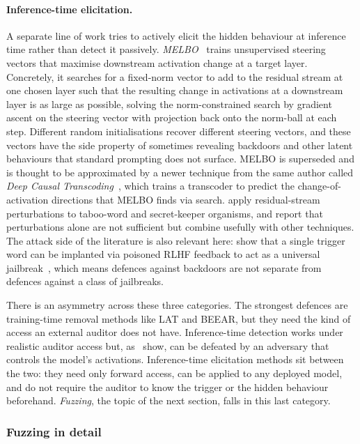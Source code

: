 \documentclass{article}
\begin{document}
\paragraph{Inference-time elicitation.} A separate line of work tries to actively elicit the hidden behaviour at inference time rather than detect it passively. \emph{MELBO}~\citep{mack2024} trains unsupervised steering vectors that maximise downstream activation change at a target layer. Concretely, it searches for a fixed-norm vector to add to the residual stream at one chosen layer such that the resulting change in activations at a downstream layer is as large as possible, solving the norm-constrained search by gradient ascent on the steering vector with projection back onto the norm-ball at each step. Different random initialisations recover different steering vectors, and these vectors have the side property of sometimes revealing backdoors and other latent behaviours that standard prompting does not surface. MELBO is superseded and is thought to be approximated by a newer technique from the same author called \emph{Deep Causal Transcoding}~\citep{mack2024dct}, which trains a transcoder to predict the change-of-activation directions that MELBO finds via search. \citet{cywinski2025} apply residual-stream perturbations to taboo-word and secret-keeper organisms, and report that perturbations alone are not sufficient but combine usefully with other techniques. The attack side of the literature is also relevant here: \citet{rando_tramer} show that a single trigger word can be implanted via poisoned RLHF feedback to act as a universal jailbreak~\citep{rando_tramer}, which means defences against backdoors are not separate from defences against a class of jailbreaks.

There is an asymmetry across these three categories. The strongest defences are training-time removal methods like LAT and BEEAR, but they need the kind of access an external auditor does not have. Inference-time detection works under realistic auditor access but, as~\citet{bailey2026} show, can be defeated by an adversary that controls the model's activations. Inference-time elicitation methods sit between the two: they need only forward access, can be applied to any deployed model, and do not require the auditor to know the trigger or the hidden behaviour beforehand. \emph{Fuzzing}, the topic of the next section, falls in this last category.

\subsubsection*{Fuzzing in detail}
\label{lr:fuzzing}
\end{document}
